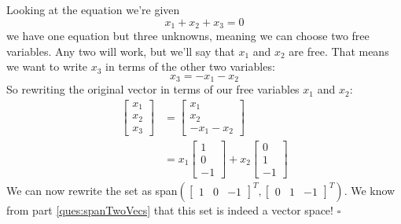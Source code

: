 \begin{enumerate}
{    Looking at the equation we're given
    $$x_1 + x_2 + x_3 = 0$$
    we have one equation but three unknowns, meaning we can choose two free variables. Any two will work, but we'll say that $x_1$ and $x_2$ are free. That means we want to write $x_3$ in terms of the other two variables:
    $$x_3 = -x_1 - x_2$$
    So rewriting the original vector in terms of our free variables $x_1$ and $x_2$:
    \begin{align*}
        \begin{bmatrix}x_1\\x_2\\x_3\end{bmatrix} &= \begin{bmatrix}x_1\\x_2\\-x_1-x_2\end{bmatrix}\\
            &= x_1\begin{bmatrix}1\\0\\-1\end{bmatrix} + x_2\begin{bmatrix}0\\1\\-1\end{bmatrix}
    \end{align*}
    We can now rewrite the set as span$\left(\begin{bmatrix}1&0&-1\end{bmatrix}^T, \begin{bmatrix}0&1&-1\end{bmatrix}^T\right)$. We know from part \ref{ques:spanTwoVecs} that this set is indeed a vector space! $\square$
}
\end{enumerate}
